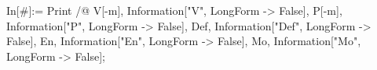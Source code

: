 In[#]:= Print /@ {V[-m], Information["V", LongForm -> False], P[-m], Information["P", LongForm -> False], Def, Information["Def", LongForm -> False], En, Information["En", LongForm -> False], Mo, Information["Mo", LongForm -> False]}; 